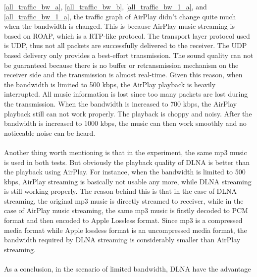 \ref{all_traffic_bw_a}, \ref{all_traffic_bw_b}, \ref{all_traffic_bw_1_a}, and \ref{all_traffic_bw_1_a}, the traffic graph of AirPlay didn't change quite much when the bandwidth is changed. This is because AirPlay music streaming is based on ROAP, which is a RTP-like protocol. The transport layer protocol used is UDP, thus not all packets are successfully delivered to the receiver. The UDP based delivery only provides a best-effort transmission. The sound quality can not be guaranteed because there is no buffer or retransmission mechanism on the receiver side and the transmission is almost real-time. Given this reason, when the bandwidth is limited to 500 kbps, the AirPlay playback is heavily interrupted. All music information is lost since too many packets are lost during the transmission. When the bandwidth is increased to 700 kbps, the AirPlay playback still can not work properly. The playback is choppy and noisy. After the bandwidth is increased to 1000 kbps, the music can then work smoothly and no noticeable noise can be heard.\\
\\
Another thing worth mentioning is that in the experiment, the same mp3 music is used in both tests. But obviously the playback quality of DLNA is better than the playback using AirPlay. For instance, when the bandwidth is limited to 500 kbps, AirPlay streaming is basically not usable any more, while DLNA streaming is still working properly. The reason behind this is that in the case of DLNA streaming, the original mp3 music is directly streamed to receiver, while in the case of AirPlay music streaming, the same mp3 music is firstly decoded to PCM format and then encoded to Apple Lossless format. Since mp3 is a compressed media format while Apple lossless format is an uncompressed media format, the bandwidth required by DLNA streaming is considerably smaller than AirPlay streaming.\\
\\
As a conclusion, in the scenario of limited bandwidth, DLNA have the advantage

